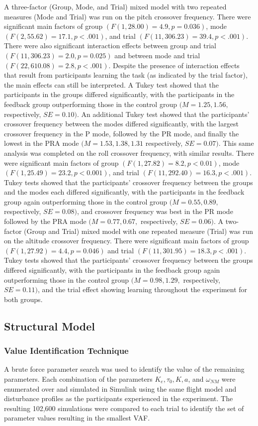 A three-factor (Group, Mode, and Trial) mixed model with two repeated measures (Mode and Trial) was run on the pitch crossover frequency.
There were significant main factors of group $(F(1, 28.00) = 4.9, p = 0.036)$, mode $(F(2, 55.62) = 17.1, p < .001)$, and trial $(F(11, 306.23) = 39.4, p < .001)$.
There were also significant interaction effects between group and trial $(F(11, 306.23) = 2.0, p = 0.025)$ and between mode and trial $(F(22, 610.08) = 2.8, p < .001)$.
Despite the presence of interaction effects that result from participants learning the task (as indicated by the trial factor), the main effects can still be interpreted.
A Tukey test showed that the participants in the groups differed significantly, with the participants in the feedback group outperforming those in the control group $(M = 1.25, 1.56,$ respectively, $SE = 0.10)$.
An additional Tukey test showed that the participants' crossover frequency between the modes differed significantly, with the largest crossover frequency in the P mode, followed by the PR mode, and finally the lowest in the PRA mode $(M = 1.53, 1.38, 1.31$ respectively, $SE = 0.07)$.
This same analysis was completed on the roll crossover frequency, with similar results.
There were significant main factors of group $(F(1, 27.82) = 8.2, p < 0.01)$, mode $(F(1, 25.49) = 23.2, p < 0.001)$, and trial $(F(11, 292.40) = 16.3, p < .001)$.
Tukey tests showed that the participants' crossover frequency between the groups and the modes each differed significantly, with the participants in the feedback group again outperforming those in the control group $(M = 0.55, 0.89,$ respectively, $SE = 0.08)$, and crossover frequency was best in the PR mode followed by the PRA mode $(M = 0.77, 0.67,$ respectively, $SE = 0.06)$.
A two-factor (Group and Trial) mixed model with one repeated measure (Trial) was run on the altitude crossover frequency.
There were significant main factors of group $(F(1, 27.92) = 4.4, p = 0.046)$ and trial $(F(11, 301.95) = 18.3, p < .001)$.
Tukey tests showed that the participants' crossover frequency between the groups differed significantly, with the participants in the feedback group again outperforming those in the control group $(M = 0.98, 1.29,$ respectively, $SE = 0.11)$, and the trial effect showing learning throughout the experiment for both groups.

\subsection{Structural Model}
\subsubsection{Value Identification Technique}
A brute force parameter search was used to identify the value of the remaining parameters.
Each combination of the parameters $K_e, \tau_0, K, a$, and $\omega_{NM}$ were enumerated over and simulated in Simulink using the same flight model and disturbance profiles as the participants experienced in the experiment.
The resulting 102,600 simulations were compared to each trial to identify the set of parameter values resulting in the smallest VAF.

